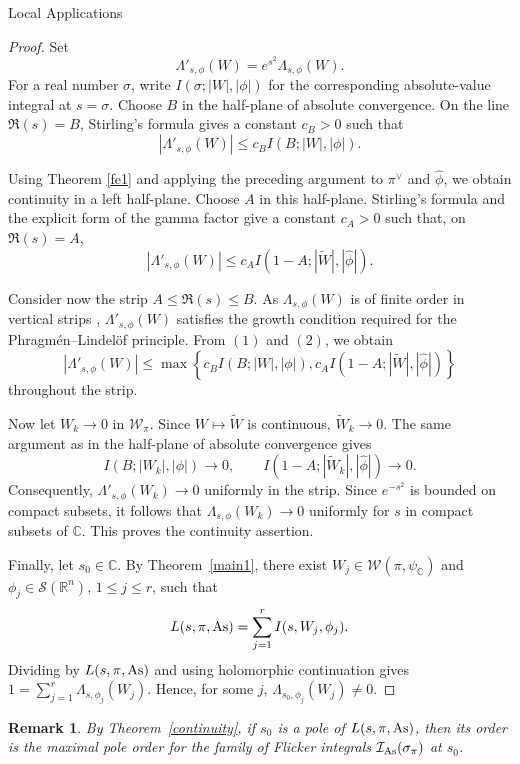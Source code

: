 \documentclass[12pt,reqno]{amsart}
\numberwithin{equation}{section}%
\numberwithin{equation}{subsection}
\newtheorem{remark}[equation]{Remark}
\theoremstyle{definition}
\theoremstyle{remark}
\begin{document}
\begin{section}{Local Applications}
\begin{proof}
Set
\[
\Lambda'_{s,\phi}(W)=e^{s^2}\Lambda_{s,\phi}(W).
\]
For a real number \(\sigma\), write
\(I(\sigma;|W|,|\phi|)\) for the corresponding absolute-value
integral at \(s=\sigma\). Choose \(B\) in the half-plane of absolute
convergence. On the line \(\Re(s)=B\), Stirling's formula gives a
constant \(c_B>0\) such that
\[
|\Lambda'_{s,\phi}(W)|
\leq c_B I(B;|W|,|\phi|).
\tag{1}
\]

Using Theorem \ref{fe1} and applying the preceding argument to \(\pi^{\vee}\) and
\(\widehat\phi\), we obtain continuity in a left half-plane. Choose
\(A\) in this half-plane. Stirling's formula and the explicit form of
the gamma factor give a constant \(c_A>0\) such that, on
\(\Re(s)=A\),
\[
|\Lambda'_{s,\phi}(W)|
\leq
c_A I(1-A;|\widetilde W|,|\widehat\phi|).
\tag{2}
\]

Consider now the strip \(A\leq\Re(s)\leq B\). As \(\Lambda_{s,\phi}(W)\) is of finite order in vertical strips \cite[Theorem~1(iii)]{BP2021}, \(\Lambda'_{s,\phi}(W)\) satisfies the growth condition required for
the Phragmén--Lindelöf principle. From \((1)\) and \((2)\), we obtain
\[
|\Lambda'_{s,\phi}(W)|
\leq
\max\left\{
c_B I(B;|W|,|\phi|),
c_A I(1-A;|\widetilde W|,|\widehat\phi|)
\right\}
\]
throughout the strip.

Now let \(W_k\to0\) in \(\mathcal{W}_{\pi}\). Since
\(W\mapsto\widetilde W\) is continuous, \(\widetilde W_k\to0\).
The same argument as in the half-plane of absolute convergence gives
\[
I(B;|W_k|,|\phi|)\longrightarrow0,
\qquad
I(1-A;|\widetilde W_k|,|\widehat\phi|)\longrightarrow0.
\]
Consequently, \(\Lambda'_{s,\phi}(W_k)\to0\) uniformly in the strip.
Since \(e^{-s^2}\) is bounded on compact subsets, it follows that
\(\Lambda_{s,\phi}(W_k)\to0\) uniformly for \(s\) in compact subsets
of \(\mathbb{C}\). This proves the continuity assertion.

Finally, let \(s_0\in\mathbb{C}\). By Theorem~\ref{main1}, there exist
\(W_j\in\mathcal{W}(\pi,\psi_{\mathbb{C}})\) and
\(\phi_j\in\mathcal{S}(\mathbb{R}^n)\), \(1\leq j\leq r\), such that
\[
L(s,\pi,{\rm As})=\sum_{j=1}^r I(s,W_j,\phi_j).
\]
Dividing by \(L(s,\pi,{\rm As})\) and using holomorphic continuation gives
\(1=\sum_{j=1}^r\Lambda_{s,\phi_j}(W_j)\). Hence, for some \(j\),
\(\Lambda_{s_0,\phi_j}(W_j)\neq0\).
\end{proof}

\begin{remark}\label{poleorder}
By Theorem~\ref{continuity}, if \(s_0\) is a pole of
\(L(s,\pi,{\rm As})\), then its order is the maximal pole order for the
family of Flicker integrals $\mathcal{I}_{\rm As}(\sigma_\pi)$ at \(s_0\).
\end{remark}


\end{section}
\end{document}
